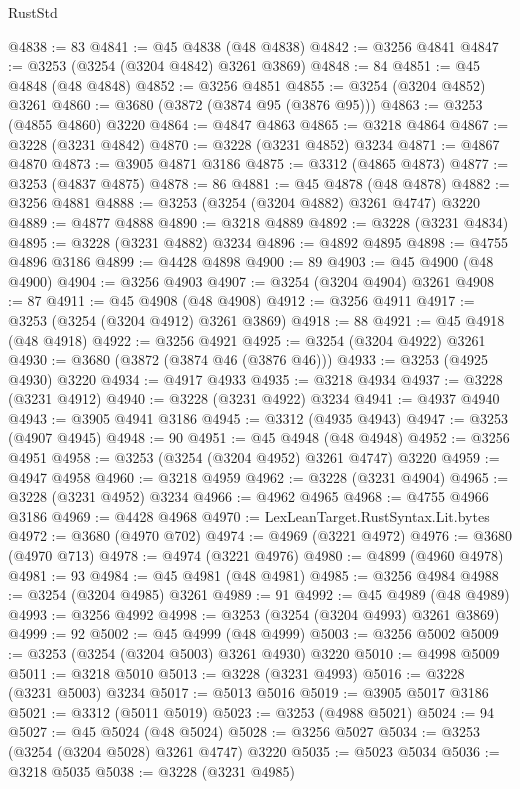 \begin{lexlean}{RustStd}
\begin{coremodule}
@4838 := 83
@4841 := @45 @4838 (@48 @4838)
@4842 := @3256 @4841
@4847 := @3253 (@3254 (@3204 @4842) @3261 @3869)
@4848 := 84
@4851 := @45 @4848 (@48 @4848)
@4852 := @3256 @4851
@4855 := @3254 (@3204 @4852) @3261
@4860 := @3680 (@3872 (@3874 @95 (@3876 @95)))
@4863 := @3253 (@4855 @4860) @3220
@4864 := @4847 @4863
@4865 := @3218 @4864
@4867 := @3228 (@3231 @4842)
@4870 := @3228 (@3231 @4852) @3234
@4871 := @4867 @4870
@4873 := @3905 @4871 @3186
@4875 := @3312 (@4865 @4873)
@4877 := @3253 (@4837 @4875)
@4878 := 86
@4881 := @45 @4878 (@48 @4878)
@4882 := @3256 @4881
@4888 := @3253 (@3254 (@3204 @4882) @3261 @4747) @3220
@4889 := @4877 @4888
@4890 := @3218 @4889
@4892 := @3228 (@3231 @4834)
@4895 := @3228 (@3231 @4882) @3234
@4896 := @4892 @4895
@4898 := @4755 @4896 @3186
@4899 := @4428 @4898
@4900 := 89
@4903 := @45 @4900 (@48 @4900)
@4904 := @3256 @4903
@4907 := @3254 (@3204 @4904) @3261
@4908 := 87
@4911 := @45 @4908 (@48 @4908)
@4912 := @3256 @4911
@4917 := @3253 (@3254 (@3204 @4912) @3261 @3869)
@4918 := 88
@4921 := @45 @4918 (@48 @4918)
@4922 := @3256 @4921
@4925 := @3254 (@3204 @4922) @3261
@4930 := @3680 (@3872 (@3874 @46 (@3876 @46)))
@4933 := @3253 (@4925 @4930) @3220
@4934 := @4917 @4933
@4935 := @3218 @4934
@4937 := @3228 (@3231 @4912)
@4940 := @3228 (@3231 @4922) @3234
@4941 := @4937 @4940
@4943 := @3905 @4941 @3186
@4945 := @3312 (@4935 @4943)
@4947 := @3253 (@4907 @4945)
@4948 := 90
@4951 := @45 @4948 (@48 @4948)
@4952 := @3256 @4951
@4958 := @3253 (@3254 (@3204 @4952) @3261 @4747) @3220
@4959 := @4947 @4958
@4960 := @3218 @4959
@4962 := @3228 (@3231 @4904)
@4965 := @3228 (@3231 @4952) @3234
@4966 := @4962 @4965
@4968 := @4755 @4966 @3186
@4969 := @4428 @4968
@4970 := LexLeanTarget.RustSyntax.Lit.bytes
@4972 := @3680 (@4970 @702)
@4974 := @4969 (@3221 @4972)
@4976 := @3680 (@4970 @713)
@4978 := @4974 (@3221 @4976)
@4980 := @4899 (@4960 @4978)
@4981 := 93
@4984 := @45 @4981 (@48 @4981)
@4985 := @3256 @4984
@4988 := @3254 (@3204 @4985) @3261
@4989 := 91
@4992 := @45 @4989 (@48 @4989)
@4993 := @3256 @4992
@4998 := @3253 (@3254 (@3204 @4993) @3261 @3869)
@4999 := 92
@5002 := @45 @4999 (@48 @4999)
@5003 := @3256 @5002
@5009 := @3253 (@3254 (@3204 @5003) @3261 @4930) @3220
@5010 := @4998 @5009
@5011 := @3218 @5010
@5013 := @3228 (@3231 @4993)
@5016 := @3228 (@3231 @5003) @3234
@5017 := @5013 @5016
@5019 := @3905 @5017 @3186
@5021 := @3312 (@5011 @5019)
@5023 := @3253 (@4988 @5021)
@5024 := 94
@5027 := @45 @5024 (@48 @5024)
@5028 := @3256 @5027
@5034 := @3253 (@3254 (@3204 @5028) @3261 @4747) @3220
@5035 := @5023 @5034
@5036 := @3218 @5035
@5038 := @3228 (@3231 @4985)

\end{coremodule}
\end{lexlean}
